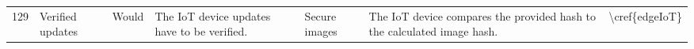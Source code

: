 \begin{table}[]
\begin{tabular}{lllllll}
129 & Verified updates                        & Would          & The IoT device updates have to be verified.                                                                                                                                                & Secure images            & The IoT device compares the provided hash to the calculated image hash.                                                                                                                                                        & \textbackslash{}cref\{edgeIoT\}   
\end{tabular}
\end{table}